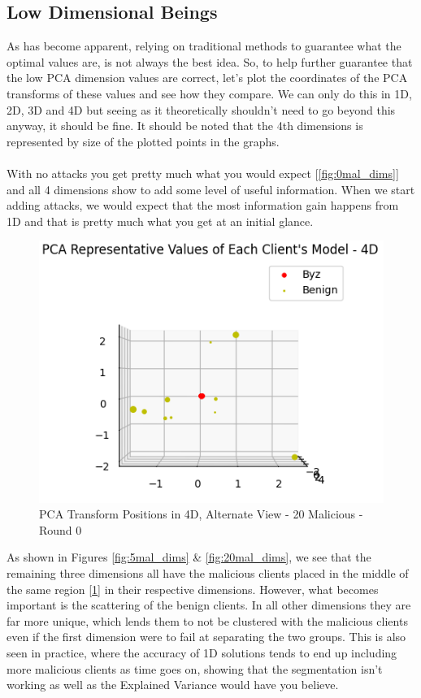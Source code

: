 \subsection{Low Dimensional Beings}
As has become apparent, relying on traditional methods to guarantee what the optimal values are, is not always the best idea.
So, to help further guarantee that the low PCA dimension values are correct, let's plot the coordinates of the PCA transforms of these values and see how they compare.
We can only do this in 1D, 2D, 3D and 4D but seeing as it theoretically shouldn't need to go beyond this anyway, it should be fine.
It should be noted that the 4th dimensions is represented by size of the plotted points in the graphs.
\\ \\
With no attacks you get pretty much what you would expect [\ref{fig:0mal_dims}] and all 4 dimensions show to add some level of useful information.
When we start adding attacks, we would expect that the most information gain happens from 1D and that is pretty much what you get at an initial glance.

\begin{figure}[htbp]
	\centering
    \includegraphics[scale=0.7]{my_agg/graphs/4d_diff.png}
	\caption{PCA Transform Positions in 4D, Alternate View - 20 Malicious - Round 0}
	\label{fig:4d_diff}
\end{figure}

As shown in Figures \ref{fig:5mal_dims} \& \ref{fig:20mal_dims}, we see that the remaining three dimensions all have the malicious clients placed in the middle of the same region [\ref{fig:4d_diff}] in their respective dimensions.
However, what becomes important is the scattering of the benign clients.
In all other dimensions they are far more unique, which lends them to not be clustered with the malicious clients even if the first dimension were to fail at separating the two groups.
This is also seen in practice, where the accuracy of 1D solutions tends to end up including more malicious clients as time goes on, showing that the segmentation isn't working as well as the Explained Variance would have you believe.

